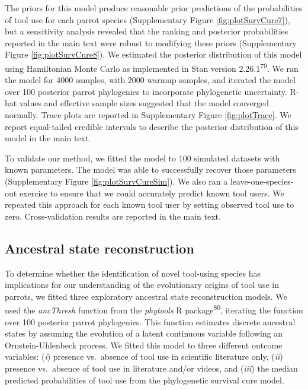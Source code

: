 \documentclass[
  man, donotrepeattitle,floatsintext]{apa6}
\begin{document}
The priors for this model produce reasonable prior predictions of the
probabilities of tool use for each parrot species (Supplementary Figure
\ref{fig:plotSurvCure7}), but a sensitivity analysis revealed that the ranking
and posterior probabilities reported in the main text were robust to modifying
these priors (Supplementary Figure \ref{fig:plotSurvCure8}). We estimated the
posterior distribution of this model using Hamiltonian Monte Carlo as
implemented in Stan version 2.26.1\textsuperscript{79}. We ran the model for 4000
samples, with 2000 warmup samples, and iterated the model over 100 posterior
parrot phylogenies to incorporate phylogenetic uncertainty. R-hat values and
effective sample sizes suggested that the model converged normally. Trace plots
are reported in Supplementary Figure \ref{fig:plotTrace}. We report
equal-tailed credible intervals to describe the posterior distribution of this
model in the main text.

To validate our method, we fitted the model to 100 simulated datasets with known
parameters. The model was able to successfully recover those parameters
(Supplementary Figure \ref{fig:plotSurvCureSim}). We also ran a
leave-one-species-out exercise to ensure that we could accurately predict known
tool users. We repeated this approach for each known tool user by setting
observed tool use to zero. Cross-validation results are reported in the main
text.

\hypertarget{ancestral-state-reconstruction}{%
\subsection{Ancestral state reconstruction}\label{ancestral-state-reconstruction}}

To determine whether the identification of novel tool-using species has
implications for our understanding of the evolutionary origins of tool use in
parrots, we fitted three exploratory ancestral state reconstruction models. We
used the \emph{ancThresh} function from the \emph{phytools} R package\textsuperscript{80},
iterating the function over 100 posterior parrot phylogenies. This function
estimates discrete ancestral states by assuming the evolution of a latent
continuous variable following an Ornstein-Uhlenbeck process. We fitted this
model to three different outcome variables: (\emph{i}) presence vs.~absence of tool
use in scientific literature only, (\emph{ii}) presence vs.~absence of tool use in
literature and/or videos, and (\emph{iii}) the median predicted probabilities of tool
use from the phylogenetic survival cure model.
\end{document}
